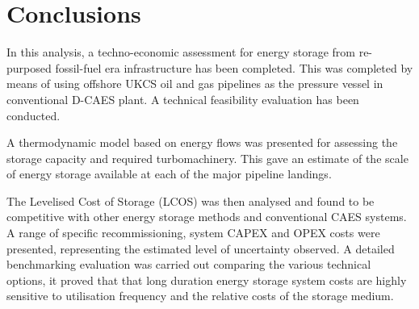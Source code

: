 \documentclass[preprint,12pt]{elsarticle}
\begin{document}
\section{Conclusions}
In this analysis, a techno-economic assessment for energy storage from re-purposed fossil-fuel era infrastructure has been completed. This was completed by means of using offshore UKCS oil and gas pipelines as the pressure vessel in conventional D-CAES plant. A technical feasibility evaluation has been conducted. 

A thermodynamic model based on energy flows was presented for assessing the storage capacity and required turbomachinery. This gave an estimate of the scale of energy storage available at each of the major pipeline landings. 

The Levelised Cost of Storage (LCOS) was then analysed and found to be competitive with other energy storage methods and conventional CAES systems. A range of specific recommissioning, system CAPEX and OPEX costs were presented, representing the estimated level of uncertainty observed. A detailed benchmarking evaluation was carried out comparing the various technical options, it proved that that long duration energy storage system costs are highly sensitive to utilisation frequency and the relative costs of the storage medium. 


  
 





\end{document}

